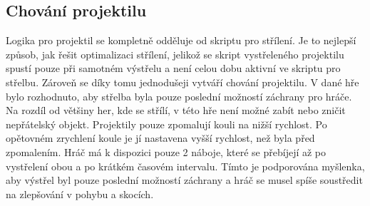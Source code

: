 \subsection{Chování projektilu}

Logika pro projektil se kompletně odděluje od skriptu pro střílení. Je to nejlepší způsob, jak řešit optimalizaci střílení, jelikož se skript vystřeleného projektilu spustí pouze při samotném výstřelu a není celou dobu aktivní ve skriptu pro střelbu. Zároveň se díky tomu jednodušeji vytváří chování projektilu. V dané hře bylo rozhodnuto, aby střelba byla pouze poslední možností záchrany pro hráče. Na rozdíl od většiny her, kde se střílí, v této hře není možné zabít nebo zničit nepřátelský objekt. Projektily pouze zpomalují kouli na nižší rychlost. Po opětovném zrychlení koule je jí nastavena vyšší rychlost, než byla před zpomalením. Hráč má k dispozici pouze 2 náboje, které se přebíjejí až po vystřelení obou a po krátkém časovém intervalu. Tímto je podporována myšlenka, aby výstřel byl pouze poslední možností záchrany a hráč se musel spíše soustředit na zlepšování v pohybu a skocích.